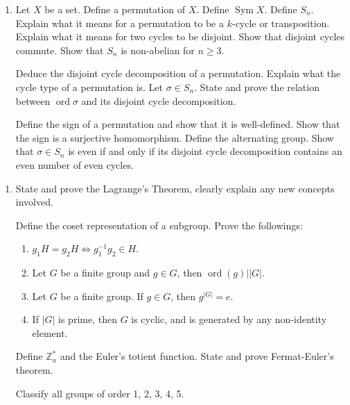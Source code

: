 \documentclass[11pt]{article}
\newlength{\qspace}
\newcounter{qnumber}
\newenvironment{question}%
 {\vspace{\qspace}
  \begin{enumerate}[\bfseries 1\quad][10]%
    \setcounter{enumi}{\value{qnumber}}%
    \item%
 }
{
  \end{enumerate}
  \filbreak
  \stepcounter{qnumber}
 }
\DeclareMathOperator{\ord}{ord}
\def\ge{\geqslant}
\begin{document}
\begin{question}
  Let $X$ be a set. Define a permutation of $X$. Define $ \operatorname{Sym}X $. Define $ S_n $. Explain what it means for a permutation to be a $k$-cycle or transposition. Explain what it means for two cycles to be disjoint. Show that disjoint cycles commute. Show that $ S_n $ is non-abelian for $ n\ge 3 $.

  Deduce the disjoint cycle decomposition of a permutation. Explain what the cycle type of a permutation is. Let $ \sigma\in S_n $. State and prove the relation between $ \operatorname{ord}\sigma $ and its disjoint cycle decomposition.

  Define the sign of a permutation and show that it is well-defined. Show that the sign is a surjective homomorphism. Define the alternating group. Show that $ \sigma\in S_n $ is even if and only if its disjoint cycle decomposition contains an even number of even cycles.
\end{question}

\begin{question}
  State and prove the Lagrange's Theorem, clearly explain any new concepts involved.

  Define the coset representation of a subgroup. Prove the followings:
  \begin{enumerate}
    \item $ g_1H=g_2H \Longleftrightarrow g_1^{-1}g_2\in H $.
    \item Let $G$ be a finite group and $g\in G$, then $ \ord(g)||G| $.
    \item Let $G$ be a finite group. If $g\in G$, then $ g^{|G|}=e $.
    \item If $ |G| $ is prime, then $G$ is cyclic, and is generated by any non-identity element.
  \end{enumerate}
  Define $\mathbb{Z}_n^*$ and the Euler's totient function. State and prove Fermat-Euler's theorem.

  Classify all groups of order 1, 2, 3, 4, 5.
\end{question}
\end{document}

